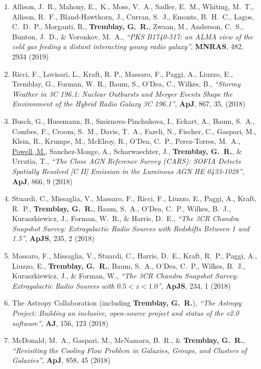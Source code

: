 \documentclass[11pt]{article}
\begin{document}
\begin{enumerate}[resume]
\item Allison, J.~R., Mahony, E.,~K., Moss, V.~A., Sadler, E.~M., Whiting, M.~T.,
Allison, R.~F., Bland-Hawthorn, J., Curran, S.~J., Emonts, B.~H.~C., Lagos, C.~D.~P.,
Morganti, R., \textbf{Tremblay, G.~R.}, Zwaan, M., Anderson, C.~S.,
Bunton, J.~D., \& Voronkov, M.~A., \textit{``PKS B1740-517: an ALMA view of the
cold gas feeding a distant interacting young radio galaxy''}, \textbf{MNRAS}, 482,
2934 (2019)


\item Ricci, F., Lovisari, L., Kraft, R. P., Massaro, F., Paggi, A., Liuzzo, E., Tremblay, G., Forman, W. R., Baum, S., O'Dea, C., Wilkes, B., \textit{``Stormy Weather in 3C 196.1: Nuclear Outbursts and Merger Events Shape the Environment of the Hybrid Radio Galaxy 3C 196.1''}, \textbf{ApJ}, 867, 35, (2018)

\item Busch, G., Husemann, B., Smirnova-Pinchukova, I., Eckart, A.,
Baum, S.~A., Combes, F., Croom, S.~M., Davis, T.~A., Fazeli, N., Fischer, C.,
Gaspari, M., Klein, R., Krumpe, M., McElroy, R., O'Dea, C.~P., Perez-Torres, M.~A.,
\uline{Powell, M.}, Sanchez-Monge, A., Scharwaechter, J., \textbf{Tremblay, G.~R.},
\& Urrutia, T., \textit{``The Close AGN Reference Survey (CARS): SOFIA Detects
Spatially Resolved [C II] Emission in the Luminous AGN HE 0433-1028''}, \textbf{ApJ},
866, 9 (2018)


\item Stuardi, C., Missaglia, V., Massaro, F., Ricci, F., Liuzzo, E.,
Paggi, A., Kraft, R.~P., \textbf{Tremblay, G.~R.}, Baum, S.~A.,
O'Dea, C.~P., Wilkes, B.~J., Kuraszkiewicz, J., Forman, W.~R., \& Harris, D.~E.,
\textit{``The 3CR Chandra Snapshot Survey: Extragalactic Radio Sources
with Redshifts Between 1 and 1.5''}, \textbf{ApJS}, 235, 2 (2018)


\item Massaro, F., Missaglia, V., Stuardi, C., Harris, D.~E.,
Kraft, R.~P., Paggi, A., Liuzzo, E., \textbf{Tremblay, G.~R.},
Baum, S.~A., O'Dea, C.~P., Wilkes, B.~J., Kuraszkiewicz, J., \& Forman, W., \textit{``The 3CR Chandra Snapshot Survey:
Extragalactic Radio Sources with $0.5 < z < 1.0$''}, \textbf{ApJS}, 234, 1 (2018)


\item The Astropy Collaboration (including \textbf{Tremblay, G.~R.}), \textit{``The Astropy Project: Building an inclusive,
open-source project and status of the v2.0 software''}, \textbf{AJ}, 156, 123 (2018)


\item McDonald, M.~A., Gaspari, M., McNamara, B.~R., \& \textbf{Tremblay, G.~R.}, \textit{``Revisiting the Cooling Flow Problem in Galaxies, Groups, and Clusters of Galaxies''}, \textbf{ApJ}, 858, 45 (2018)



\end{enumerate}
\end{document}
